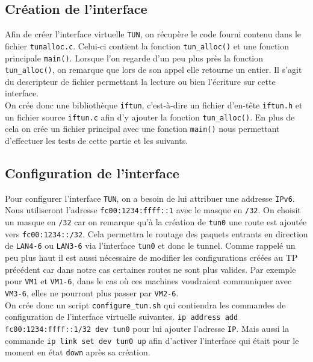 \documentclass[a4paper, 12pt]{article}
\begin{document}
    \subsection{Création de l'interface}
    Afin de créer l'interface virtuelle \verb+TUN+, on récupère le code fourni 
    contenu dans le fichier \verb+tunalloc.c+. Celui-ci contient la fonction 
    \verb+tun_alloc()+ et une fonction principale \verb+main()+. Lorsque l'on 
    regarde d'un peu plus près la fonction \verb+tun_alloc()+, on remarque que 
    lors de son appel elle retourne un entier. Il s'agit du descripteur de 
    fichier permettant la lecture ou bien l'écriture sur cette interface. \\

    On crée donc une bibliothèque \verb+iftun+, c'est-à-dire un fichier 
    d'en-tête \verb+iftun.h+ et un fichier source \verb+iftun.c+ afin d'y 
    ajouter la fonction \verb+tun_alloc()+. En plus de cela on crée un fichier 
    principal avec une fonction \verb+main()+ nous permettant d'effectuer les 
    tests de cette partie et les suivants.

    \subsection{Configuration de l'interface}
    Pour configurer l'interface \verb+TUN+, on a besoin de lui attribuer une 
    addresse \verb+IPv6+. Nous utiliseront l'adresse \verb+fc00:1234:ffff::1+ 
    avec le masque en \verb+/32+. On choisit un masque en \verb+/32+ car on 
    remarque qu'à la création de \verb+tun0+ une route est ajoutée vers 
    \verb+fc00:1234::/32+. Cela permettra le routage des paquets entrants en 
    direction de \verb+LAN4-6+ ou \verb+LAN3-6+ via l'interface \verb+tun0+ et
    donc le tunnel. Comme rappelé un peu plus haut il est aussi nécessaire de 
    modifier les configurations créées au TP précédent car dans notre cas 
    certaines routes ne sont plus valides. Par exemple pour \verb+VM1+ et 
    \verb+VM1-6+, dans le cas où ces machines voudraient communiquer avec 
    \verb+VM3-6+, elles ne pourront plus passer par \verb+VM2-6+. \\

    On crée donc un script \verb+configure_tun.sh+ qui contiendra les commandes
    de configuration de l'interface virtuelle suivantes.
    \verb+ip address add fc00:1234:ffff::1/32 dev tun0+ pour lui ajouter 
    l'adresse \verb+IP+. Mais aussi la commande \verb+ip link set dev tun0 up+
    afin d'activer l'interface qui était pour le moment en état \verb+down+ 
    après sa création. \\
\end{document}
